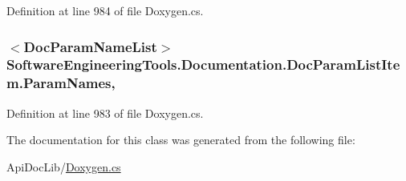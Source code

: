 Definition at line 984 of file Doxygen.\+cs.

\hypertarget{class_software_engineering_tools_1_1_documentation_1_1_doc_param_list_item_ad01ae5f9eec5ea62d109669011cd1057}{
\subsubsection[{Param\+Names}]{$<${\bf Doc\+Param\+Name\+List}$>$ Software\+Engineering\+Tools.\+Documentation.\+Doc\+Param\+List\+Item.\+Param\+Names\hspace{0.3cm}{\ttfamily [get]}, {\ttfamily [set]}}}\label{class_software_engineering_tools_1_1_documentation_1_1_doc_param_list_item_ad01ae5f9eec5ea62d109669011cd1057}


Definition at line 983 of file Doxygen.\+cs.



The documentation for this class was generated from the following file\+:\begin{DoxyCompactItemize}
\item 
Api\+Doc\+Lib/\hyperlink{_doxygen_8cs}{Doxygen.\+cs}\end{DoxyCompactItemize}
